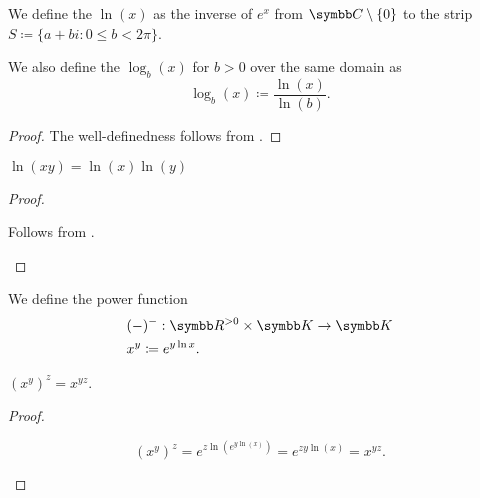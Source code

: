 \begin{definition}\label{def:logarithm}
  We define the  \( \ln(x) \) as the inverse of \( e^x \) from \( \BC \setminus \{ 0 \} \) to the strip \( S \coloneqq \{ a + bi \colon 0 \leq b < 2\pi \} \).

  We also define the  \( \log_b(x) \) for \( b > 0 \) over the same domain as
  \begin{equation*}
    \log_b(x) \coloneqq \frac {\ln(x)} {\ln(b)}.
  \end{equation*}
\end{definition}
\begin{proof}
  The well-definedness follows from .
\end{proof}

\begin{proposition}\label{thm:logarithm_properties}
  \mbox{}
  \begin{propenum}
     \( \ln(xy) = \ln(x) \ln(y) \)
  \end{propenum}
\end{proposition}
\begin{proof}
  \begin{description}
     Follows from .
  \end{description}
\end{proof}

\begin{definition}\label{def:power_function}
  We define the power function
  \begin{align*}
    &(-)^{-}: \BR^{>0} \times \BK \to \BK \\
    &x^y \coloneqq e^{y \ln x}.
  \end{align*}
\end{definition}

\begin{proposition}\label{thm:power_function_properties}
  \mbox{}
  \begin{propenum}
     \( (x^y)^z = x^{yz} \).
  \end{propenum}
\end{proposition}
\begin{proof}
  \begin{description}
    \begin{equation*}
      (x^y)^z
      =
      e^{z \ln(e^{y \ln(x)})}
      =
      e^{z y \ln(x)}
      =
      x^{yz}.
    \end{equation*}
  \end{description}
\end{proof}

